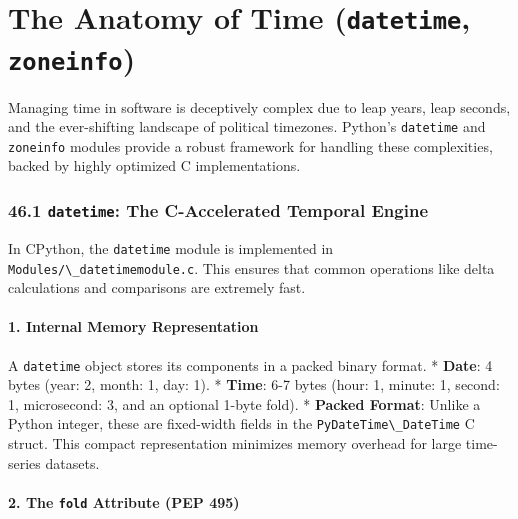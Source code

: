 \hypertarget{the-anatomy-of-time-datetime-zoneinfo}{%
\chapter{\texorpdfstring{The Anatomy of Time (\texttt{datetime},
\texttt{zoneinfo})}{The Anatomy of Time (datetime, zoneinfo)}}\label{the-anatomy-of-time-datetime-zoneinfo}}

Managing time in software is deceptively complex due to leap years, leap
seconds, and the ever-shifting landscape of political timezones.
Python's \passthrough{\lstinline!datetime!} and
\passthrough{\lstinline!zoneinfo!} modules provide a robust framework
for handling these complexities, backed by highly optimized C
implementations.

\hypertarget{datetime-the-c-accelerated-temporal-engine}{%
\subsection{\texorpdfstring{46.1 \texttt{datetime}: The C-Accelerated
Temporal
Engine}{46.1 datetime: The C-Accelerated Temporal Engine}}\label{datetime-the-c-accelerated-temporal-engine}}

In CPython, the \passthrough{\lstinline!datetime!} module is implemented
in \passthrough{\lstinline!Modules/\_datetimemodule.c!}. This ensures
that common operations like delta calculations and comparisons are
extremely fast.

\hypertarget{internal-memory-representation}{%
\subsubsection{1. Internal Memory
Representation}\label{internal-memory-representation}}

A \passthrough{\lstinline!datetime!} object stores its components in a
packed binary format. * \textbf{Date}: 4 bytes (year: 2, month: 1, day:
1). * \textbf{Time}: 6-7 bytes (hour: 1, minute: 1, second: 1,
microsecond: 3, and an optional 1-byte fold). * \textbf{Packed Format}:
Unlike a Python integer, these are fixed-width fields in the
\passthrough{\lstinline!PyDateTime\_DateTime!} C struct. This compact
representation minimizes memory overhead for large time-series datasets.

\hypertarget{the-fold-attribute-pep-495}{%
\subsubsection{\texorpdfstring{2. The \texttt{fold} Attribute (PEP
495)}{2. The fold Attribute (PEP 495)}}\label{the-fold-attribute-pep-495}}

